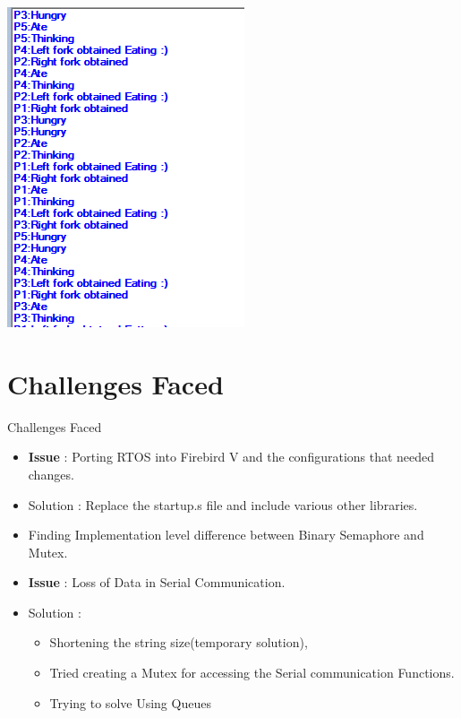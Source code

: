 \documentclass[10pt, a4paper]{beamer}
\begin{document}
\begin{frame}
\includegraphics{Dinning}
\end{frame}

\section{Challenges Faced}
\begin{frame}{Challenges Faced}
    \begin{itemize}
        \item \textbf{Issue} : Porting RTOS into Firebird V and the configurations that needed changes.
        \item Solution : Replace the startup.s file and include various other libraries.
        
        \item Finding Implementation level difference between Binary Semaphore and Mutex.
        
        \item \textbf{Issue} : Loss of Data in Serial Communication.
        \item Solution :
        
        \begin{itemize}
        \item Shortening the string size(temporary solution),
        \item Tried creating a Mutex for accessing the Serial communication Functions.
        \item Trying to solve Using Queues
        \end{itemize}
        
    \end{itemize}
\end{frame}
\end{document}
